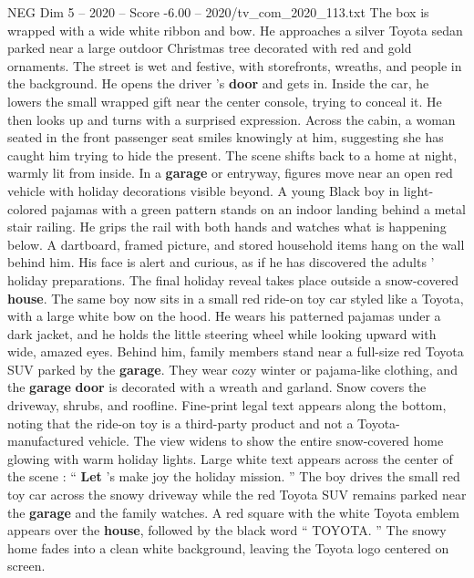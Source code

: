 \begin{textsample}{NEG Dim 5 – 2020 – Score -6.00 – 2020/tv\_com\_2020\_113.txt}
The box is wrapped with a wide white ribbon and bow.
He approaches a silver Toyota sedan parked near a large outdoor Christmas tree decorated with red and gold ornaments.
The street is wet and festive, with storefronts, wreaths, and people in the background.
He opens the driver ’s \textbf{door} and gets in.
Inside the car, he lowers the small wrapped gift near the center console, trying to conceal it.
He then looks up and turns with a surprised expression.
Across the cabin, a woman seated in the front passenger seat smiles knowingly at him, suggesting she has caught him trying to hide the present.
The scene shifts back to a home at night, warmly lit from inside.
In a \textbf{garage} or entryway, figures move near an open red vehicle with holiday decorations visible beyond.
A young Black boy in light-colored pajamas with a green pattern stands on an indoor landing behind a metal stair railing.
He grips the rail with both hands and watches what is happening below.
A dartboard, framed picture, and stored household items hang on the wall behind him.
His face is alert and curious, as if he has discovered the adults ’ holiday preparations.
The final holiday reveal takes place outside a snow-covered \textbf{house}.
The same boy now sits in a small red ride-on toy car styled like a Toyota, with a large white bow on the hood.
He wears his patterned pajamas under a dark jacket, and he holds the little steering wheel while looking upward with wide, amazed eyes.
Behind him, family members stand near a full-size red Toyota SUV parked by the \textbf{garage}.
They wear cozy winter or pajama-like clothing, and the \textbf{garage} \textbf{door} is decorated with a wreath and garland.
Snow covers the driveway, shrubs, and roofline.
Fine-print legal text appears along the bottom, noting that the ride-on toy is a third-party product and not a Toyota-manufactured vehicle.
The view widens to show the entire snow-covered home glowing with warm holiday lights.
Large white text appears across the center of the scene : “ \textbf{Let} ’s make joy the holiday mission. ” The boy drives the small red toy car across the snowy driveway while the red Toyota SUV remains parked near the \textbf{garage} and the family watches.
A red square with the white Toyota emblem appears over the \textbf{house}, followed by the black word “ TOYOTA. ” The snowy home fades into a clean white background, leaving the Toyota logo centered on screen.

\end{textsample}

